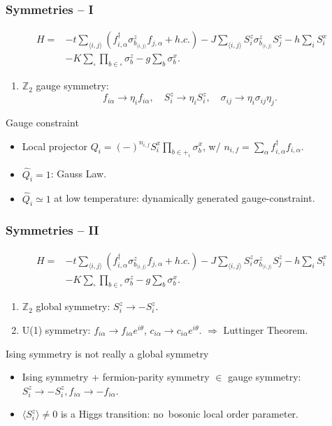 \documentclass[xcolor=table, 10pt, aspectratio=43]{beamer}
\begin{document}
\begin{frame}
\frametitle{Symmetries -- I}
\begin{align*}
	H= &-t\sum_{\langle i,j \rangle} (f^{\dagger}_{i,\alpha} \sigma^{z}_{b_{\langle i,j \rangle}}f_{j,\alpha} + h.c.)
	-J \sum_{\langle i,j \rangle} S^{z}_{i} \sigma^{z}_{b_{\langle i,j \rangle}} S^{z}_{j} - h \sum_{i} S^{x}_{i}\\
&-K \sum_{\square}\prod_{b\in\square} \sigma^{z}_{b} - g\sum_{b} \sigma^{x}_{b}.
\end{align*}
\begin{enumerate}
\item $\mathbb Z_2$ gauge symmetry:
\[f_{i\alpha}\rightarrow\eta_if_{i\alpha},
\quad S_i^z\rightarrow\eta_iS_i^z,
\quad \sigma_{ij}\rightarrow
\eta_i\sigma_{ij}\eta_j.\]
\end{enumerate}
\begin{block}{Gauge constraint}
\begin{itemize}
\item Local projector $Q_i = (-)^{n_{i,f}}S^{x}_{i}\prod_{b\in +_i}\sigma^{x}_{b}$, w/ $n_{i,f}=\sum_{\alpha}f^{\dagger}_{i,\alpha}f_{i,\alpha}$.
\item $\hat Q_i=1$: Gauss Law.
\item $\hat Q_i\simeq1$ at low temperature: dynamically generated gauge-constraint.
\end{itemize}
\end{block}
\end{frame}

\begin{frame}
\frametitle{Symmetries -- II}
\begin{align*}
	H= &-t\sum_{\langle i,j \rangle} (f^{\dagger}_{i,\alpha} \sigma^{z}_{b_{\langle i,j \rangle}}f_{j,\alpha} + h.c.)
	-J \sum_{\langle i,j \rangle} S^{z}_{i} \sigma^{z}_{b_{\langle i,j \rangle}} S^{z}_{j} - h \sum_{i} S^{x}_{i}\\
&-K \sum_{\square}\prod_{b\in\square} \sigma^{z}_{b} - g\sum_{b} \sigma^{x}_{b}.
\end{align*}
\begin{enumerate}
	\addtocounter{enumi}{1}
\item $\mathbb Z_2$ \alert{global} symmetry:
$S_i^z\rightarrow -S_i^z$.
\item U(1) symmetry:
$f_{i\alpha}\rightarrow f_{i\alpha}e^{i\theta}$, $c_{i\alpha}\rightarrow c_{i\alpha}e^{i\theta}$.
$\Rightarrow$ Luttinger Theorem.
\end{enumerate}
\begin{block}{Ising symmetry is not really a global symmetry}
\begin{itemize}
\item Ising symmetry + fermion-parity symmetry $\in$ gauge symmetry:\\
$S_i^z\rightarrow-S_i^z,f_{i\alpha}\rightarrow-f_{i\alpha}$.
\item $\langle S_i^z\rangle\neq0$ is a \alert{Higgs} transition:
no\ bosonic local order parameter.
\end{itemize}
\end{block}
\end{frame}
\end{document}

